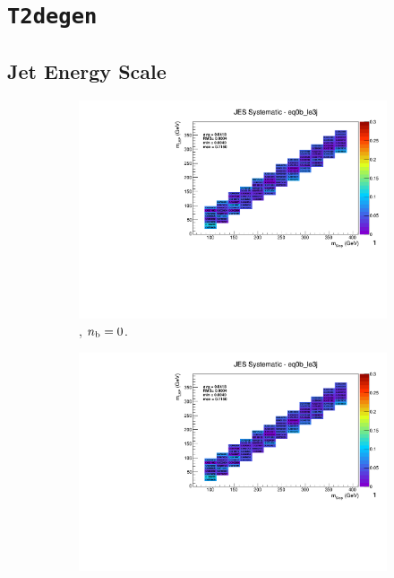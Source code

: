 \clearpage
\section*{\texttt{T2degen}}
\label{sec:t2degen_syst_plots}

\newpage
\subsection*{Jet Energy Scale}
\label{sec:t2degen_jes_plots}

\begin{figure}[ht!]
  \centering
  \begin{subfigure}[b]{0.32\textwidth}
    \includegraphics[width=\textwidth, page=12]{Figs/sms/t2degen/v19_2/systs/T2_4body_JES_eq0b_le3j.pdf}
    \caption{\njlow, $n_{\text{b}} = 0$.}
  \end{subfigure}
  \begin{subfigure}[b]{0.32\textwidth}
    \includegraphics[width=\textwidth, page=8]{Figs/sms/t2degen/v19_2/systs/T2_4body_JES_eq0b_le3j.pdf}

\end{subfigure}
\end{figure}
